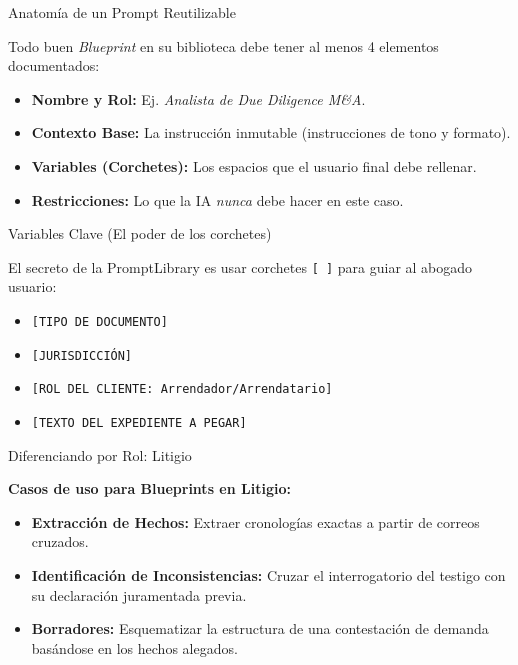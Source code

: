 \documentclass[aspectratio=169]{beamer}
\begin{document}
\begin{frame}{Anatomía de un Prompt Reutilizable}

Todo buen \textit{Blueprint} en su biblioteca debe tener al menos 4 elementos documentados:
\begin{itemize}
  \item \textbf{Nombre y Rol:} Ej. \textit{Analista de Due Diligence M\&A}.
  \item \textbf{Contexto Base:} La instrucción inmutable (instrucciones de tono y formato).
  \item \textbf{Variables (Corchetes):} Los espacios que el usuario final debe rellenar.
  \item \textbf{Restricciones:} Lo que la IA \textit{nunca} debe hacer en este caso.
\end{itemize}
\end{frame}

\begin{frame}{Variables Clave (El poder de los corchetes)}

El secreto de la PromptLibrary es usar corchetes \texttt{[ ]} para guiar al abogado usuario:
\begin{itemize}
  \item \texttt{[TIPO DE DOCUMENTO]}
  \item \texttt{[JURISDICCIÓN]}
  \item \texttt{[ROL DEL CLIENTE: Arrendador/Arrendatario]}
  \item \texttt{[TEXTO DEL EXPEDIENTE A PEGAR]}
\end{itemize}
\end{frame}

\begin{frame}{Diferenciando por Rol: Litigio}

\textbf{Casos de uso para Blueprints en Litigio:}
\begin{itemize}
  \item \textbf{Extracción de Hechos:} Extraer cronologías exactas a partir de correos cruzados.
  \item \textbf{Identificación de Inconsistencias:} Cruzar el interrogatorio del testigo con su declaración juramentada previa.
  \item \textbf{Borradores:} Esquematizar la estructura de una contestación de demanda basándose en los hechos alegados.
\end{itemize}
\end{frame}
\end{document}
